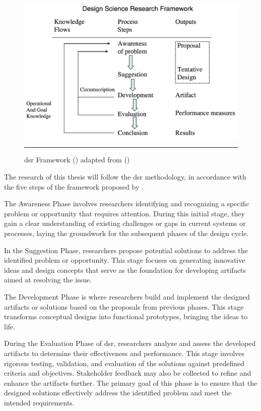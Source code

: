 \begin{figure}[htbp]
    \centering
 \includegraphics[width=.9\textwidth]{figures/research-design/design-science-research-framework.png}
     \rule{35em}{0.5pt}
    \caption{\acrlong{dsr} Framework (\textcite{Hevner2010}) adapted from (\textcite{Vaishnavi2007})} 
 \label{fig:design-science-research-framework}
\end{figure}

The research of this thesis will follow the \gls{dsr} methodology, in accordance with the five steps of the framework proposed by \textcite{Hevner2010}.

The Awareness Phase involves researchers identifying and recognizing a specific problem or opportunity that requires attention.
During this initial stage, they gain a clear understanding of existing challenges or gaps in current systems or processes, laying the groundwork for the subsequent phases of the design cycle.

In the Suggestion Phase, researchers propose potential solutions to address the identified problem or opportunity.
This stage focuses on generating innovative ideas and design concepts that serve as the foundation for developing artifacts aimed at resolving the issue.

The Development Phase is where researchers build and implement the designed artifacts or solutions based on the proposals from previous phases.
This stage transforms conceptual designs into functional prototypes, bringing the ideas to life.

During the Evaluation Phase of \gls{dsr}, researchers analyze and assess the developed artifacts to determine their effectiveness and performance.
This stage involves rigorous testing, validation, and evaluation of the solutions against predefined criteria and objectives.
Stakeholder feedback may also be collected to refine and enhance the artifacts further.
The primary goal of this phase is to ensure that the designed solutions effectively address the identified problem and meet the intended requirements.

